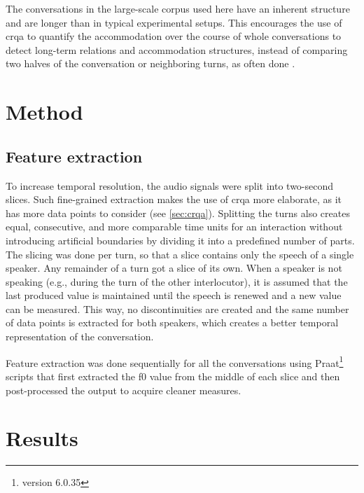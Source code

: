 The conversations in the large-scale corpus used here have an inherent structure and are longer than in typical experimental setups.
This encourages the use of \ac{crqa} to quantify the accommodation over the course of whole conversations to detect long-term relations and accommodation structures, instead of comparing two halves of the conversation or neighboring turns, as often done \citep{Levitan2013entrainment,Rahimi2018weighting}.


\section{Method}
\label{sec:method}

\subsection{Feature extraction}
\label{subsec:feature_extraction}

To increase temporal resolution, the audio signals were split into two-second slices.
Such fine-grained extraction makes the use of \ac{crqa} more elaborate, as it has more data points to consider (see \cref{sec:crqa}).
Splitting the turns also creates equal, consecutive, and more comparable time units for an interaction without introducing artificial boundaries by dividing it into a predefined number of parts.
The slicing was done per turn, so that a slice contains only the speech of a single speaker.
Any remainder of a turn got a slice of its own.
When a speaker is not speaking (e.g., during the turn of the other interlocutor), it is assumed that the last produced value is maintained until the speech is renewed and a new value can be measured.
This way, no discontinuities are created and the same number of data points is extracted for both speakers, which creates a better temporal representation of the conversation.

Feature extraction was done sequentially for all the conversations using Praat\footnote{version 6.0.35} \citep{Boersma2001praat} scripts that first extracted the \ac{f0} value from the middle of each slice and then post-processed the output to acquire cleaner measures.

\section{Results}
\label{sec:results}

